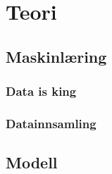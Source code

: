 



\section{Teori}

\subsection{Maskinlæring}
\subsubsection{Data is king}
\subsubsection{Datainnsamling}
\subsection{Modell}
